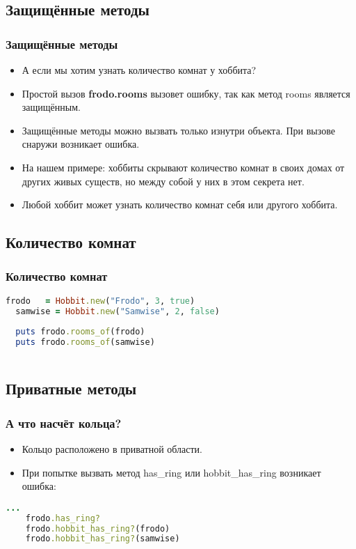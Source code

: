 \documentclass[compress,red]{beamer}
\begin{document}
\subsection{Защищённые методы}
\begin{frame}[fragile]
  \frametitle{Защищённые методы}
  \begin{itemize}
    \item А если мы хотим узнать количество комнат у хоббита?
    \item Простой вызов \textbf{frodo.rooms} вызовет ошибку, так как метод rooms является защищённым.
    \item Защищённые методы можно вызвать только изнутри объекта. При вызове снаружи возникает ошибка.
    \item На нашем примере: хоббиты скрывают количество комнат в своих домах от других живых существ, но между собой у них в этом секрета нет.
    \item Любой хоббит может узнать количество комнат себя или другого хоббита.
  \end{itemize}
\end{frame}

\subsection{Количество комнат}
\begin{frame}[fragile]
  \frametitle{Количество комнат}
  \scriptsize{
  \begin{lstlisting}[language=ruby,basicstyle=\footnotesize,label=ruby4,caption=Количество комнат]
  frodo   = Hobbit.new("Frodo", 3, true)
  samwise = Hobbit.new("Samwise", 2, false)
  
  puts frodo.rooms_of(frodo)
  puts frodo.rooms_of(samwise)
    
  \end{lstlisting}
  }
  
\end{frame}

\subsection{Приватные методы}
\begin{frame}[fragile]
  \frametitle{А что насчёт кольца?}
  \begin{itemize}
    \item Кольцо расположено в приватной области.
    \item При попытке вызвать метод has\_ring или hobbit\_has\_ring возникает ошибка:
  \end{itemize}
  \scriptsize{
  \begin{lstlisting}[language=ruby,basicstyle=\footnotesize,label=ruby5,caption=Ошибка при вызове]
    ...
    frodo.has_ring?
    frodo.hobbit_has_ring?(frodo)  
    frodo.hobbit_has_ring?(samwise)  
  \end{lstlisting}
  }
\end{frame}
\end{document}
